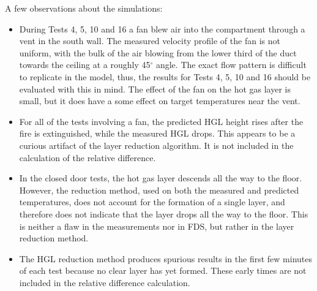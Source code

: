 A few observations about the simulations:
\begin{itemize}
\item During Tests 4, 5, 10 and 16 a fan blew air into the compartment through a vent in the south wall.
The measured velocity profile of the fan is not uniform, with the bulk of the air blowing from the lower third of the duct towards the ceiling at a
roughly 45$^\circ$ angle.  The exact flow pattern is difficult to replicate in the model, thus, the results for Tests 4, 5, 10 and 16 should be evaluated
with this in mind. The effect of the fan on the hot gas layer is small, but it does have a some effect on target temperatures near the vent.
\item For all of the tests involving a fan, the predicted HGL height rises after the fire is extinguished,
while the measured HGL drops.  This appears to be a curious artifact of the layer reduction algorithm. It is not included in the calculation of the
relative difference.
\item In the closed door tests, the hot gas layer descends all the way to the floor.
However, the reduction method, used on both the measured and predicted temperatures, does not account for the formation of a single layer, and
therefore does not indicate that the layer drops all the way to the floor. This is neither a flaw in the measurements nor in FDS, but rather in the
layer reduction method.
\item The HGL reduction method produces spurious results in the first few minutes of each test because no clear layer has yet formed.
These early times are not included in the relative difference calculation.
\end{itemize}

